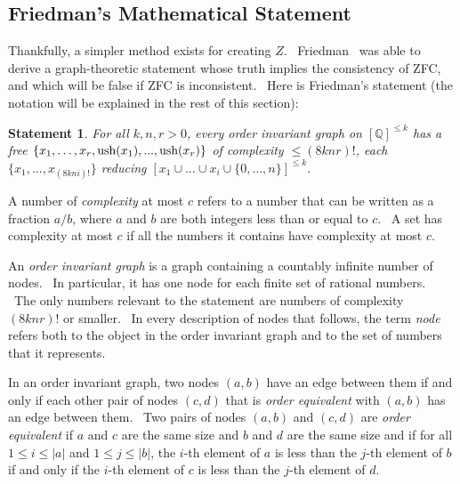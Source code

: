 \documentclass[11pt]{article}
\newtheorem{statement}{Statement}
\begin{document}
\subsection{Friedman's Mathematical Statement} \label{sec:friedmanstate}

Thankfully, a simpler method exists for creating $Z$. \ Friedman~\cite{friedman}
was able to derive a graph-theoretic statement whose truth implies the consistency of ZFC, and which will be false if ZFC is inconsistent.\footnotemark
{} \
Here is Friedman's statement (the notation will be explained in the rest of this section):

\begin{statement} \label{eq:friedman}
For all $k, n, r > 0$, every order invariant graph on $[\mathbb{Q}]^{\le k}$ has a free $\{x_1,\dots,x_r, \\
\textrm{ush}(x_1),...,\textrm{ush}(x_r)\}$ of complexity $\le (8knr)!$, each $\{x_1, \dots, x_{(8kni)!}\}$
reducing $[x_1 \cup \dots \cup x_i \cup \{0,\dots,n\}]^{\le k}$. \cite{friedman}
\end{statement}

A number of \emph{complexity} at most $c$ refers to a number that can be written as a fraction $a/b$, where $a$ and $b$ are both integers less than or equal to $c$. \ A set has complexity at most $c$ if all the numbers it contains have complexity at most $c$.

An \emph{order invariant graph} is a graph containing a countably infinite number of nodes. \ In particular, it has one node for each finite set of rational numbers. \ The only numbers relevant to the statement are numbers of complexity $(8knr)!$ or smaller. \ In every description of nodes that follows, the term \emph{node} refers both to the object in the order invariant graph and to the set of numbers that it represents.

In an order invariant graph, two nodes $(a,b)$ have an edge between them if and only if each other pair of nodes $(c,d)$ that is \emph{order equivalent} with $(a,b)$ has an edge between them. \ Two pairs of nodes $(a, b)$ and $(c, d)$ are \emph{order equivalent} if $a$ and $c$ are the same size and $b$ and $d$ are the same size and if for all $1 \le i \le |a|$ and $1 \le j \le |b|$, the $i$-th element of $a$ is less than the $j$-th element of $b$ if and only if the $i$-th element of $c$ is less than the $j$-th element of $d$.
\end{document}

